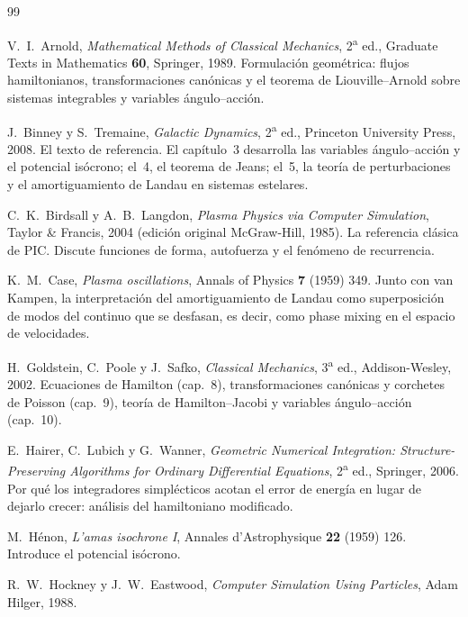 \documentclass[11pt,a4paper]{article}
\theoremstyle{definition}
\begin{document}
\begin{thebibliography}{99}

V.~I.~Arnold,
\emph{Mathematical Methods of Classical Mechanics}, 2\textsuperscript{a} ed.,
Graduate Texts in Mathematics \textbf{60}, Springer, 1989.
\newblock Formulación geométrica: flujos hamiltonianos, transformaciones canónicas y
el teorema de Liouville--Arnold sobre sistemas integrables y variables
ángulo--acción.

J.~Binney y S.~Tremaine,
\emph{Galactic Dynamics}, 2\textsuperscript{a} ed.,
Princeton University Press, 2008.
\newblock El texto de referencia. El capítulo~3 desarrolla las variables
ángulo--acción y el potencial isócrono; el~4, el teorema de Jeans; el~5, la teoría
de perturbaciones y el amortiguamiento de Landau en sistemas estelares.

C.~K.~Birdsall y A.~B.~Langdon,
\emph{Plasma Physics via Computer Simulation},
Taylor \& Francis, 2004 (edición original McGraw-Hill, 1985).
\newblock La referencia clásica de PIC. Discute funciones de forma, autofuerza y el
fenómeno de recurrencia.

K.~M.~Case,
\emph{Plasma oscillations},
Annals of Physics \textbf{7} (1959) 349.
\newblock Junto con van Kampen, la interpretación del amortiguamiento de Landau
como superposición de modos del continuo que se desfasan, es decir, como phase
mixing en el espacio de velocidades.

H.~Goldstein, C.~Poole y J.~Safko,
\emph{Classical Mechanics}, 3\textsuperscript{a} ed.,
Addison-Wesley, 2002.
\newblock Ecuaciones de Hamilton (cap.~8), transformaciones canónicas y corchetes de
Poisson (cap.~9), teoría de Hamilton--Jacobi y variables ángulo--acción (cap.~10).

E.~Hairer, C.~Lubich y G.~Wanner,
\emph{Geometric Numerical Integration: Structure-Preserving Algorithms for
Ordinary Differential Equations}, 2\textsuperscript{a} ed.,
Springer, 2006.
\newblock Por qué los integradores simplécticos acotan el error de energía en lugar
de dejarlo crecer: análisis del hamiltoniano modificado.

M.~Hénon,
\emph{L'amas isochrone I},
Annales d'Astrophysique \textbf{22} (1959) 126.
\newblock Introduce el potencial isócrono.

R.~W.~Hockney y J.~W.~Eastwood,
\emph{Computer Simulation Using Particles},
Adam Hilger, 1988.


\end{thebibliography}
\end{document}
